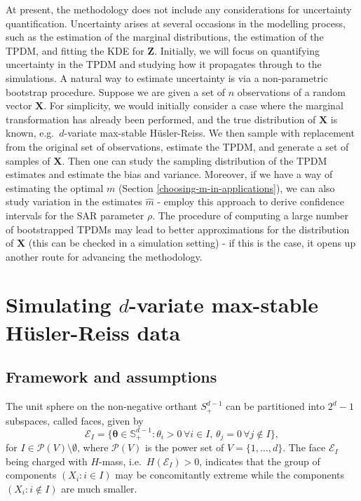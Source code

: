 \documentclass[en-GB, a4paper, nobind]{templates/bathreport}
\begin{document}
At present, the methodology does not include any considerations for uncertainty quantification. Uncertainty arises at several occasions in the modelling process, such as the estimation of the marginal distributions, the estimation of the TPDM, and fitting the KDE for \(\bm{Z}\). Initially, we will focus on quantifying uncertainty in the TPDM and studying how it propagates through to the simulations. A natural way to estimate uncertainty is via a non-parametric bootstrap procedure. Suppose we are given a set of \(n\) observations of a random vector \(\bm{X}\). For simplicity, we would initially consider a case where the marginal transformation has already been performed, and the true distribution of \(\bm{X}\) is known, e.g.~\(d\)-variate max-stable Hüsler-Reiss. We then sample with replacement from the original set of observations, estimate the TPDM, and generate a set of samples of \(\bm{X}\). Then one can study the sampling distribution of the TPDM estimates and estimate the bias and variance. Moreover, if we have a way of estimating the optimal \(m\) (Section \ref{choosing-m-in-applications}), we can also study variation in the estimates \(\hat{m}\) - \textcite{fixSimultaneousAutoregressiveModels2021} employ this approach to derive confidence intervals for the SAR parameter \(\rho\). The procedure of computing a large number of bootstrapped TPDMs may lead to better approximations for the distribution of \(\bm{X}\) (this can be checked in a simulation setting) - if this is the case, it opens up another route for advancing the methodology.

\startappendices

\hypertarget{sim-hr}{%
\chapter{\texorpdfstring{Simulating \(d\)-variate max-stable Hüsler-Reiss data}{Simulating d-variate max-stable Hüsler-Reiss data}}\label{sim-hr}}

\hypertarget{framework-and-assumptions}{%
\section{Framework and assumptions}\label{framework-and-assumptions}}

The unit sphere on the non-negative orthant \(S_+^{d-1}\) can be partitioned into \(2^d-1\) subspaces, called faces, given by
\begin{equation}
\mathcal{E}_I = \{\bm{\theta}\in\mathbb{S}_+^{d-1}:\theta_i>0\,\forall i\in I, \, \theta_j=0\,\forall j\notin I\},
\label{eq:unit-sphere-faces}
\end{equation}
for \(I\in\mathcal{P}(V)\setminus \emptyset\), where \(\mathcal{P}(V)\) is the power set of \(V=\{1,\ldots,d\}\). The face \(\mathcal{E}_I\) being charged with \(H\)-mass, i.e.~\(H(\mathcal{E}_I)>0\), indicates that the group of components \((X_i:i\in I)\) may be concomitantly extreme while the components \((X_i:i\notin I)\) are much smaller.
\end{document}
